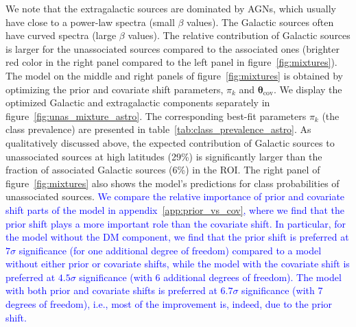 \documentclass[12pt, a4paper]{article}
\newcommand{\new}[1]{\textcolor{blue}{#1}}
\newcommand{\btheta}{\boldsymbol{\theta}}
\begin{document}
We note that the extragalactic sources are dominated by AGNs, which usually have close to a power-law spectra (small $\beta$ values).
The Galactic sources often have curved spectra (large $\beta$ values).
The relative contribution of Galactic sources is larger for the unassociated sources compared to the associated ones (brighter red color in the right panel compared to the left panel in figure~\ref{fig:mixtures}).
The model on the middle and right panels of figure~\ref{fig:mixtures} is obtained by optimizing the prior and covariate shift parameters, $\pi_k$ and $\btheta_\textrm{cov}$.
We display the optimized Galactic and extragalactic components separately in figure~\ref{fig:unas_mixture_astro}.
The corresponding best-fit parameters $\pi_k$ (the class prevalence) are presented in table~\ref{tab:class_prevalence_astro}. 
As qualitatively discussed above, the expected contribution of Galactic sources to unassociated sources at high latitudes (29\%) is significantly larger than the fraction of associated Galactic sources (6\%) in the ROI.
The right panel of figure~\ref{fig:mixtures} also shows the model's predictions for class probabilities of unassociated sources. 
\new{
We compare the relative importance of prior and covariate shift parts of the model in appendix~\ref{app:prior_vs_cov}, where
we find that the prior shift plays a more important role than the covariate shift.
In particular, for the model without the DM component, we find that the prior shift is preferred at $7\sigma$ significance (for one additional degree of freedom) compared to a model without either prior or covariate shifts, while the model with the covariate shift is preferred at $4.5\sigma$ significance (with 6 additional degrees of freedom). The model with both prior and covariate shifts is preferred at $6.7\sigma$ significance (with 7 degrees of freedom), i.e., most of the improvement is, indeed, due to the prior shift.
}
\end{document}
